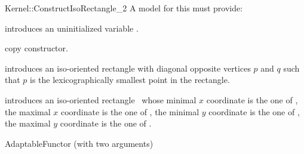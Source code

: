 \begin{ccRefFunctionObjectConcept}{Kernel::ConstructIsoRectangle_2}
A model for this must provide:



\ccHidden {}
             {introduces an uninitialized variable .}

\ccHidden {}
            {copy constructor.}

            {introduces an iso-oriented rectangle  with diagonal
             opposite vertices $p$ and $q$ such that $p$ is the
             lexicographically smallest point in the rectangle.}

            {introduces an iso-oriented rectangle \ccVar\ whose
             minimal $x$ coordinate is the one of , the
             maximal $x$ coordinate is the one of , the
             minimal $y$ coordinate is the one of , the
             maximal $y$ coordinate is the one of .}

\ccRefines
AdaptableFunctor (with two arguments)

\ccSeeAlso
{} \\

\end{ccRefFunctionObjectConcept}

